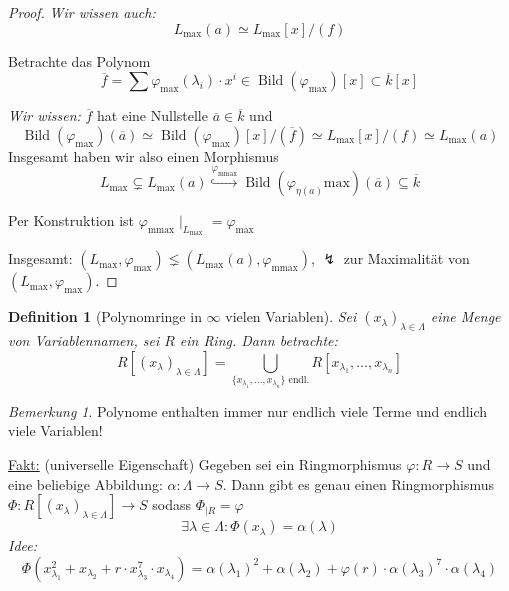 \documentclass[a4paper,12pt,numbers=noenddot,parskip=full]{scrartcl}
\newcommand{\heading}{\underline}
\theoremstyle{dotless}
\newtheorem{definition}[theorem]{Definition}
\theoremstyle{remark}
\newtheorem*{remark}{Bemerkung}
\begin{document}
\begin{proof}
		\textit{Wir wissen auch:}
		\begin{equation*}
			L_\text{max}(a) \simeq L_\text{max}[x] / (f)
		\end{equation*}
		
		Betrachte das Polynom
		\begin{equation*}
			\overline{f} = \sum \varphi_\text{max}(\lambda_i) \cdot x^i \in \operatorname{Bild}(\varphi_\text{max})[x] \subset \overline{k}[x]
		\end{equation*}
		
		\textit{Wir wissen:} $\overline{f}$ hat eine Nullstelle $\overline{a} \in \overline{k}$ und 
		\begin{equation*}
			\operatorname{Bild}(\varphi_\text{max})(\overline{a}) \simeq \operatorname{Bild}(\varphi_\text{max})[x] / (\overline{f}) \simeq L_\text{max}[x]/ (f) \simeq L_\text{max}(a)
		\end{equation*}
		Insgesamt haben wir also einen Morphismus
		\begin{equation*}
			L_\text{max} \subsetneq L_\text{max}(a) \overset{\varphi_\text{mmax}}{\hookrightarrow} \operatorname{Bild}(\varphi_{\eta(a)}\text{max})(\overline{a}) \subseteq \overline{k}
		\end{equation*}
		
		Per Konstruktion ist $\varphi_\text{mmax} \mid_{L_\text{max}} = \varphi_\text{max}$
		
		Insgesamt: $(L_\text{max}, \varphi_\text{max}) \lneq (L_\text{max}(a), \varphi_\text{mmax})$, $\lightning$ zur Maximalität von $(L_\text{max}, \varphi_\text{max})$.
	\end{proof}

	\begin{definition}[Polynomringe in $\infty$ vielen Variablen]
		Sei $(x_\lambda)_{\lambda \in \Lambda}$ eine Menge von Variablennamen, sei $R$ ein Ring. Dann betrachte:
		\begin{equation*}
			R[(x_\lambda)_{\lambda \in \Lambda}] = \bigcup_{ \{ x_{\lambda_1}, \dots, x_{\lambda_n} \} \text{ endl.} } R[x_{\lambda_1}, \dots, x_{\lambda_n}]
		\end{equation*}
	\end{definition}

	\begin{remark}
		Polynome enthalten immer nur endlich viele Terme und endlich viele Variablen!
	\end{remark}

	\heading{Fakt:} (universelle Eigenschaft) Gegeben sei ein Ringmorphismus $\varphi: R \to S$ und eine beliebige Abbildung: $\alpha: \Lambda \to S$. Dann gibt es genau einen Ringmorphismus $\Phi: R[(x_\lambda)_{\lambda \in \Lambda}] \to S$ sodass $\Phi_{\mid R} = \varphi$
	\begin{equation*}
		\exists \lambda \in \Lambda: \Phi(x_\lambda) = \alpha(\lambda)
	\end{equation*}
	\textit{Idee:}
	\begin{equation*}
		\Phi(x_{\lambda_1}^2 + x_{\lambda_2} + r \cdot x_{\lambda_3}^7 \cdot x_{\lambda_4}) = \alpha(\lambda_1)^2 + \alpha(\lambda_2) + \varphi(r) \cdot \alpha(\lambda_3)^7 \cdot \alpha(\lambda_4)
	\end{equation*}
\end{document}
